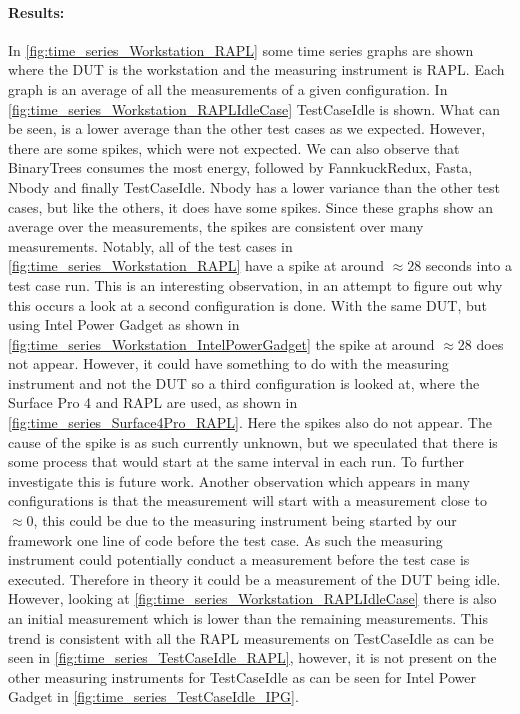 \paragraph{Results:}
In \cref{fig:time_series_Workstation_RAPL} some time series graphs are shown where the DUT is the workstation and the measuring instrument is RAPL. Each graph is an average of all the measurements of a given configuration. In \cref{fig:time_series_Workstation_RAPLIdleCase} TestCaseIdle is shown. What can be seen, is a lower average than the other test cases as we expected. However, there are some spikes, which were not expected. We can also observe that BinaryTrees consumes the most energy, followed by FannkuckRedux, Fasta, Nbody and finally TestCaseIdle. Nbody has a lower variance than the other test cases, but like the others, it does have some spikes. Since these graphs show an average over the measurements, the spikes are consistent over many measurements. Notably, all of the test cases in \cref{fig:time_series_Workstation_RAPL} have a spike at around $\approx28$ seconds into a test case run. This is an interesting observation, in an attempt to figure out why this occurs a look at a second configuration is done. With the same DUT, but using Intel Power Gadget as shown in \cref{fig:time_series_Workstation_IntelPowerGadget} the spike at around $\approx28$ does not appear. However, it could have something to do with the measuring instrument and not the DUT so a third configuration is looked at, where the Surface Pro 4 and RAPL are used, as shown in \cref{fig:time_series_Surface4Pro_RAPL}. Here the spikes also do not appear. The cause of the spike is as such currently unknown, but we speculated that there is some process that would start at the same interval in each run. To further investigate this is future work. Another observation which appears in many configurations is that the measurement will start with a measurement close to $\approx0$, this could be due to the measuring instrument being started by our framework one line of code before the test case. As such the measuring instrument could potentially conduct a measurement before the test case is executed. Therefore in theory it could be a measurement of the DUT being idle. However, looking at \cref{fig:time_series_Workstation_RAPLIdleCase} there is also an initial measurement which is lower than the remaining measurements. This trend is consistent with all the RAPL measurements on TestCaseIdle as can be seen in \cref{fig:time_series_TestCaseIdle_RAPL}, however, it is not present on the other measuring instruments for TestCaseIdle as can be seen for Intel Power Gadget in \cref{fig:time_series_TestCaseIdle_IPG}. %


